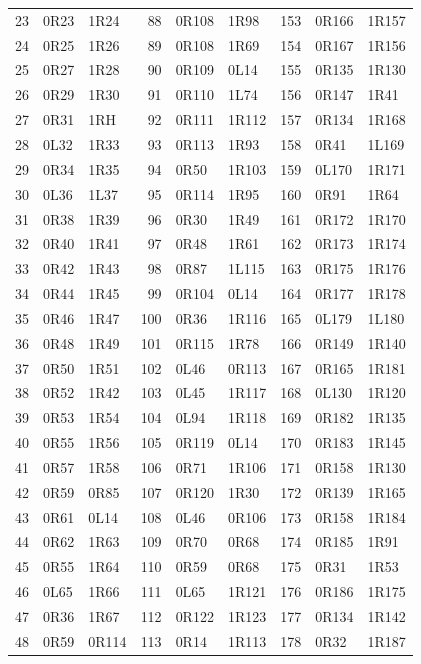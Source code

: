 {\begin{longtable}{@{}rll@{\hspace{1.4em}}rll@{\hspace{1.4em}}rll@{}}
23 & 0R23 & 1R24 & 88 & 0R108 & 1R98 & 153 & 0R166 & 1R157\\
24 & 0R25 & 1R26 & 89 & 0R108 & 1R69 & 154 & 0R167 & 1R156\\
25 & 0R27 & 1R28 & 90 & 0R109 & 0L14 & 155 & 0R135 & 1R130\\
26 & 0R29 & 1R30 & 91 & 0R110 & 1L74 & 156 & 0R147 & 1R41\\
27 & 0R31 & 1RH & 92 & 0R111 & 1R112 & 157 & 0R134 & 1R168\\
28 & 0L32 & 1R33 & 93 & 0R113 & 1R93 & 158 & 0R41 & 1L169\\
29 & 0R34 & 1R35 & 94 & 0R50 & 1R103 & 159 & 0L170 & 1R171\\
30 & 0L36 & 1L37 & 95 & 0R114 & 1R95 & 160 & 0R91 & 1R64\\
31 & 0R38 & 1R39 & 96 & 0R30 & 1R49 & 161 & 0R172 & 1R170\\
32 & 0R40 & 1R41 & 97 & 0R48 & 1R61 & 162 & 0R173 & 1R174\\
33 & 0R42 & 1R43 & 98 & 0R87 & 1L115 & 163 & 0R175 & 1R176\\
34 & 0R44 & 1R45 & 99 & 0R104 & 0L14 & 164 & 0R177 & 1R178\\
35 & 0R46 & 1R47 & 100 & 0R36 & 1R116 & 165 & 0L179 & 1L180\\
36 & 0R48 & 1R49 & 101 & 0R115 & 1R78 & 166 & 0R149 & 1R140\\
37 & 0R50 & 1R51 & 102 & 0L46 & 0R113 & 167 & 0R165 & 1R181\\
38 & 0R52 & 1R42 & 103 & 0L45 & 1R117 & 168 & 0L130 & 1R120\\
39 & 0R53 & 1R54 & 104 & 0L94 & 1R118 & 169 & 0R182 & 1R135\\
40 & 0R55 & 1R56 & 105 & 0R119 & 0L14 & 170 & 0R183 & 1R145\\
41 & 0R57 & 1R58 & 106 & 0R71 & 1R106 & 171 & 0R158 & 1R130\\
42 & 0R59 & 0R85 & 107 & 0R120 & 1R30 & 172 & 0R139 & 1R165\\
43 & 0R61 & 0L14 & 108 & 0L46 & 0R106 & 173 & 0R158 & 1R184\\
44 & 0R62 & 1R63 & 109 & 0R70 & 0R68 & 174 & 0R185 & 1R91\\
45 & 0R55 & 1R64 & 110 & 0R59 & 0R68 & 175 & 0R31 & 1R53\\
46 & 0L65 & 1R66 & 111 & 0L65 & 1R121 & 176 & 0R186 & 1R175\\
47 & 0R36 & 1R67 & 112 & 0R122 & 1R123 & 177 & 0R134 & 1R142\\
48 & 0R59 & 0R114 & 113 & 0R14 & 1R113 & 178 & 0R32 & 1R187\\

\end{longtable}}

